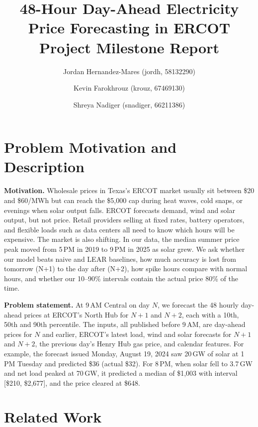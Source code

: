 \documentclass[11pt]{article}
\title{\vspace{-2em}48-Hour Day-Ahead Electricity Price Forecasting in ERCOT\\\large Project Milestone Report}
\author{Jordan Hernandez-Mares (jordh, 58132290) \and Kevin Farokhrouz (krouz, 67469130) \and Shreya Nadiger (snadiger, 66211386)}
\date{\vspace{-1.5em}}
\begin{document}
\maketitle
\vspace{-1.5em}

\section{Problem Motivation and Description}

\textbf{Motivation.} Wholesale prices in Texas's ERCOT market usually sit between \$20 and \$60/MWh but can reach the \$5{,}000 cap during heat waves, cold snaps, or evenings when solar output falls. ERCOT forecasts demand, wind and solar output, but not price. Retail providers selling at fixed rates, battery operators, and flexible loads such as data centers all need to know which hours will be expensive. The market is also shifting. In our data, the median summer price peak moved from 5\,PM in 2019 to 9\,PM in 2025 as solar grew. We ask whether our model beats naive and LEAR baselines, how much accuracy is lost from tomorrow (N+1) to the day after (N+2), how spike hours compare with normal hours, and whether our 10--90\% intervals contain the actual price 80\% of the time.

\textbf{Problem statement.} At 9\,AM Central on day $N$, we forecast the 48 hourly day-ahead prices at ERCOT's North Hub for $N{+}1$ and $N{+}2$, each with a 10th, 50th and 90th percentile. The inputs, all published before 9\,AM, are day-ahead prices for $N$ and earlier, ERCOT's latest load, wind and solar forecasts for $N{+}1$ and $N{+}2$, the previous day's Henry Hub gas price, and calendar features. For example, the forecast issued Monday, August 19, 2024 saw 20\,GW of solar at 1\,PM Tuesday and predicted \$36 (actual \$32). For 8\,PM, when solar fell to 3.7\,GW and net load peaked at 70\,GW, it predicted a median of \$1{,}003 with interval [\$210, \$2{,}677], and the price cleared at \$648.

\section{Related Work}
\end{document}
